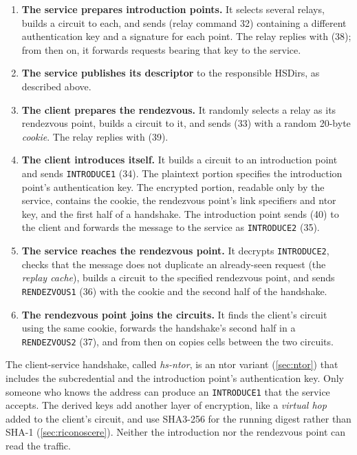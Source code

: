 \begin{enumerate}
  \item \textbf{The service prepares introduction points.} It selects several relays, builds a circuit to each, and sends  (relay command 32) containing a different authentication key and a signature for each point. The relay replies with  (38); from then on, it forwards requests bearing that key to the service.
  \item \textbf{The service publishes its descriptor} to the responsible HSDirs, as described above.
  \item \textbf{The client prepares the rendezvous.} It randomly selects a relay as its rendezvous point, builds a circuit to it, and sends  (33) with a random 20-byte \emph{cookie}. The relay replies with  (39).
  \item \textbf{The client introduces itself.} It builds a circuit to an introduction point and sends \texttt{INTRODUCE1} (34). The plaintext portion specifies the introduction point's authentication key. The encrypted portion, readable only by the service, contains the cookie, the rendezvous point's link specifiers and ntor key, and the first half of a handshake. The introduction point sends  (40) to the client and forwards the message to the service as \texttt{INTRODUCE2} (35).
  \item \textbf{The service reaches the rendezvous point.} It decrypts \texttt{INTRODUCE2}, checks that the message does not duplicate an already-seen request (the \emph{replay cache}), builds a circuit to the specified rendezvous point, and sends \texttt{RENDEZVOUS1} (36) with the cookie and the second half of the handshake.
  \item \textbf{The rendezvous point joins the circuits.} It finds the client's circuit using the same cookie, forwards the handshake's second half in a \texttt{RENDEZVOUS2} (37), and from then on copies cells between the two circuits.
\end{enumerate}

The client-service handshake, called \emph{hs-ntor}, is an ntor variant (\cref{sec:ntor}) that includes the subcredential and the introduction point's authentication key. Only someone who knows the address can produce an \texttt{INTRODUCE1} that the service accepts. The derived keys add another layer of encryption, like a \emph{virtual hop} added to the client's circuit, and use SHA3-256 for the running digest rather than SHA-1 (\cref{sec:riconoscere}). Neither the introduction nor the rendezvous point can read the traffic.


